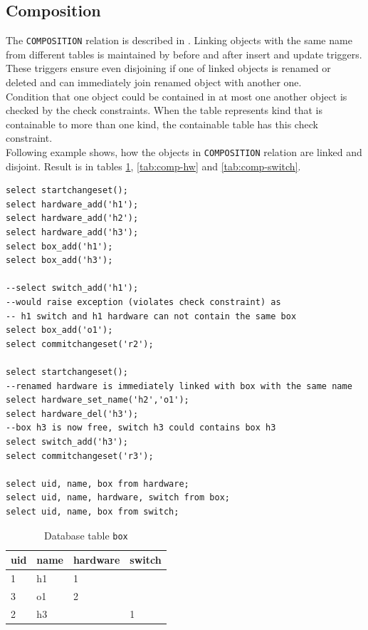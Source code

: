 \documentclass[deska]{subfiles}
\begin{document}
\subsection{Composition}
The {\tt COMPOSITION} relation is described in .
Linking objects with the same name from different tables is maintained by before and after insert and update triggers. These triggers ensure even disjoining if one of linked objects is renamed or deleted and can immediately join renamed object with another one.\\
Condition that one object could be contained in at most one another object is checked by the check constraints. When the table represents kind that is containable to more than one kind, the containable table has this check constraint.\\
Following example shows, how the objects in {\tt COMPOSITION} relation are linked and disjoint. Result is in tables \ref{tab:comp-box}, \ref{tab:comp-hw} and \ref{tab:comp-switch}.

\begin{verbatim}
select startchangeset();
select hardware_add('h1');
select hardware_add('h2');
select hardware_add('h3');
select box_add('h1');
select box_add('h3');

--select switch_add('h1');
--would raise exception (violates check constraint) as
-- h1 switch and h1 hardware can not contain the same box
select box_add('o1');
select commitchangeset('r2');

select startchangeset();
--renamed hardware is immediately linked with box with the same name
select hardware_set_name('h2','o1');
select hardware_del('h3');
--box h3 is now free, switch h3 could contains box h3
select switch_add('h3');
select commitchangeset('r3');

select uid, name, box from hardware;
select uid, name, hardware, switch from box;
select uid, name, box from switch;
\end{verbatim}

\begin{longtable}{ l | l | l | l }
    \caption{Database table {\tt box}}\\
    uid & name & hardware & switch\\
    \hline
    \endhead
\label{tab:comp-box}
    1 & h1 & 1 & \\
    3 & o1 & 2 & \\
    2 & h3 &  & 1\\
    \hline
\end{longtable}
\end{document}
